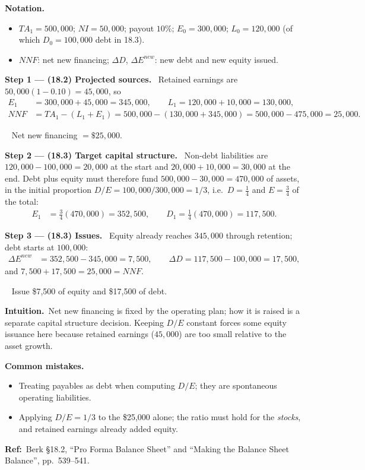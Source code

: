 \documentclass[11pt,a4paper]{article}
\newcommand{\notation}{\par\noindent\textbf{Notation.}}
\newcommand{\step}[2]{\par\medskip\noindent\textbf{Step #1 --- #2.}~}
\newcommand{\intuition}{\par\medskip\noindent\textbf{Intuition.}~}
\newcommand{\refbib}{\par\smallskip\noindent\textbf{Ref:}~}
\newcommand{\answer}[1]{\par\smallskip\noindent\fbox{\textbf{Answer #1.}}~}
\newcommand{\pitfalls}{\par\medskip\noindent\textbf{Common mistakes.}}
\begin{document}
\notation
\begin{itemize}
  \item $TA_1=500{,}000$; $NI=50{,}000$; payout $10\%$; $E_0=300{,}000$; $L_0=120{,}000$ (of which $D_0=100{,}000$ debt in 18.3).
  \item $NNF$: net new financing; $\Delta D$, $\Delta E^{new}$: new debt and new equity issued.
\end{itemize}

\step{1}{(18.2) Projected sources} Retained earnings are $50{,}000(1-0.10)=45{,}000$, so
\begin{align}
  E_1 &= 300{,}000+45{,}000 = 345{,}000, \qquad L_1 = 120{,}000+10{,}000 = 130{,}000, \nonumber\\
  NNF &= TA_1-(L_1+E_1) = 500{,}000-(130{,}000+345{,}000) = 500{,}000-475{,}000 = 25{,}000. \label{r2ce6-nnf}
\end{align}
\answer{(18.2)} Net new financing $=\$25{,}000$.

\step{2}{(18.3) Target capital structure} Non-debt liabilities are $120{,}000-100{,}000=20{,}000$ at the
start and $20{,}000+10{,}000=30{,}000$ at the end. Debt plus equity must therefore fund
$500{,}000-30{,}000=470{,}000$ of assets, in the initial proportion $D/E=100{,}000/300{,}000=1/3$, i.e.\
$D=\tfrac14$ and $E=\tfrac34$ of the total:
\begin{align}
  E_1 &= \tfrac34(470{,}000) = 352{,}500, \qquad D_1 = \tfrac14(470{,}000) = 117{,}500. \label{r2ce6-split}
\end{align}

\step{3}{(18.3) Issues} Equity already reaches $345{,}000$ through retention; debt starts at $100{,}000$:
\begin{align}
  \Delta E^{new} &= 352{,}500-345{,}000 = 7{,}500, \qquad \Delta D = 117{,}500-100{,}000 = 17{,}500, \nonumber
\end{align}
and $7{,}500+17{,}500=25{,}000=NNF$.
\answer{(18.3)} Issue \$7,500 of equity and \$17,500 of debt.

\intuition Net new financing is fixed by the operating plan; how it is raised is a separate capital
structure decision. Keeping $D/E$ constant forces some equity issuance here because retained earnings
($45{,}000$) are too small relative to the asset growth.
\pitfalls
\begin{itemize}
  \item Treating payables as debt when computing $D/E$; they are spontaneous operating liabilities.
  \item Applying $D/E=1/3$ to the \$25,000 alone; the ratio must hold for the \emph{stocks}, and retained
        earnings already added equity.
\end{itemize}
\refbib{Berk \S18.2, ``Pro Forma Balance Sheet'' and ``Making the Balance Sheet Balance'', pp.~539--541.}
\end{document}
